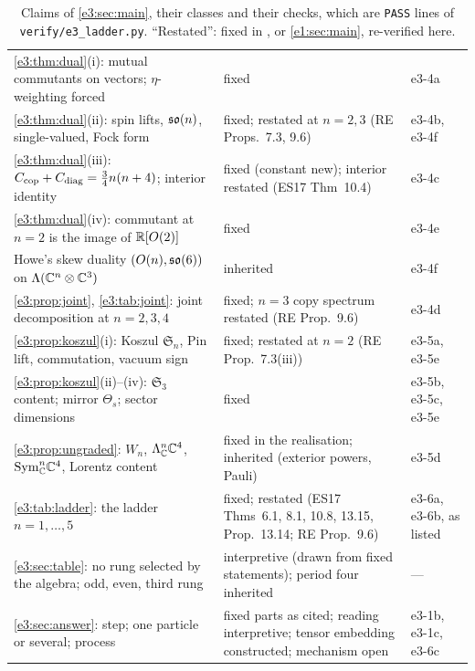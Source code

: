 \begin{table}[!htbp]
\begin{tabular}{@{}>{\raggedright\arraybackslash}p{8.2cm}>{\raggedright\arraybackslash}p{4.5cm}>{\raggedright\arraybackslash}p{2.2cm}@{}}
\cref{e3:thm:dual}(i): mutual commutants on vectors; $\eta$-weighting forced & fixed & e3-4a\\
\cref{e3:thm:dual}(ii): spin lifts, $\mathfrak{so}(n)$, single-valued, Fock form & fixed; restated at $n=2,3$ (RE Props.~7.3, 9.6) & e3-4b, e3-4f\\
\cref{e3:thm:dual}(iii): $C_{\rm cop}+C_{\rm diag}=\tfrac34n(n+4)$; interior identity & fixed (constant new); interior restated (ES17 Thm~10.4) & e3-4c\\
\cref{e3:thm:dual}(iv): commutant at $n=2$ is the image of $\mathbb{R}[O(2)]$ & fixed & e3-4e\\
Howe's skew duality $(O(n),\mathfrak{so}(6))$ on $\Lambda(\mathbb{C}^n\otimes\mathbb{C}^3)$ & inherited \cite{Howe89} & e3-4f\\
\cref{e3:prop:joint}, \cref{e3:tab:joint}: joint decomposition at $n=2,3,4$ & fixed; $n=3$ copy spectrum restated (RE Prop.~9.6) & e3-4d\\
\cref{e3:prop:koszul}(i): Koszul $\mathfrak S_n$, Pin lift, commutation, vacuum sign & fixed; restated at $n=2$ (RE Prop.~7.3(iii)) & e3-5a, e3-5e\\
\cref{e3:prop:koszul}(ii)--(iv): $\mathfrak S_3$ content; mirror $\Theta_s$; sector dimensions & fixed & e3-5b, e3-5c, e3-5e\\
\cref{e3:prop:ungraded}: $W_n$, $\Lambda^n_{\mathbb{C}}\mathbb{C}^4$, $\mathrm{Sym}^n_{\mathbb{C}}\mathbb{C}^4$, Lorentz content & fixed in the realisation; inherited (exterior powers, Pauli) & e3-5d\\
\cref{e3:tab:ladder}: the ladder $n=1,\dots,5$ & fixed; restated (ES17 Thms~6.1, 8.1, 10.8, 13.15, Prop.~13.14; RE Prop.~9.6) & e3-6a, e3-6b, as listed\\
\cref{e3:sec:table}: no rung selected by the algebra; odd, even, third rung & interpretive (drawn from fixed statements); period four inherited & ---\\
\cref{e3:sec:answer}: step; one particle or several; process & fixed parts as cited; reading interpretive; tensor embedding constructed; mechanism open & e3-1b, e3-1c, e3-6c\\
\bottomrule
\end{tabular}
\caption{Claims of \cref{e3:sec:main}, their classes and their checks, which are \texttt{PASS} lines of \texttt{verify/e3\_ladder.py}.
``Restated'': fixed in \cite{ES17}, \cite{RE} or \cref{e1:sec:main}, re-verified here.}
\label{e3:tab:claims}
\end{table}
